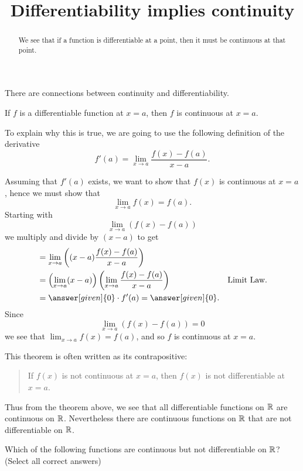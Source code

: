\documentclass{ximera}
\title[Dig-In:]{Differentiability implies continuity}
\begin{document}
\begin{abstract}
We see that if a function is differentiable at a point, then it must
be continuous at that point.
\end{abstract}
\maketitle

There are connections between continuity and differentiability.

\begin{theorem}
If $f$ is a differentiable function at $x = a$, then $f$ is continuous
at $x=a$.
\begin{explanation}
To explain why this is true, we are going to use the following
definition of the derivative
\[
f'(a) = \lim_{x\to a} \frac{f(x)-f(a)}{x-a}.
\]

  Assuming that $f'(a)$ exists, we want to show that $f(x)$ is
continuous at $x=a$, hence we must show that
\[
\lim_{x\to a} f(x) = f(a).
\]
Starting with
\[
\lim_{x\to a} \left(f(x) - f(a)\right)
\]
we multiply and divide by $(x-a)$ to get
\begin{align*}
  &= \lim_{x\to a} \left((x-a)\frac{f(x) - f(a)}{x-a}\right) \\
  &= \left(\lim_{x\to a} (x-a) \right) \left(\lim_{x\to a}\frac{f(x) - f(a)}{x-a}\right) &\text{Limit Law.} \\
  &= \answer[given]{0}\cdot f'(a) = \answer[given]{0}.
\end{align*}
Since 
\[
\lim_{x\to a}\left(f(x) - f(a)\right) = 0 
\]
we see that $\lim_{x\to a} f(x) = f(a)$, and so $f$ is continuous at
$x=a$.
\end{explanation}
\end{theorem}

This theorem is often written as its contrapositive:
\begin{quote}
If $f(x)$ is not continuous at $x=a$, then $f(x)$ is not
differentiable at $x=a$.
\end{quote}


Thus from the theorem above, we see that all differentiable functions
on $\mathbb R$ are continuous on $\mathbb R$. Nevertheless there are continuous
functions on $\mathbb R$ that are not differentiable on $\mathbb R$.

\begin{problem}
  Which of the following functions are continuous but not
  differentiable on $\mathbb R$? (Select all correct answers)
  \begin{selectAll}
  \end{selectAll}
\end{problem}
\end{document}
